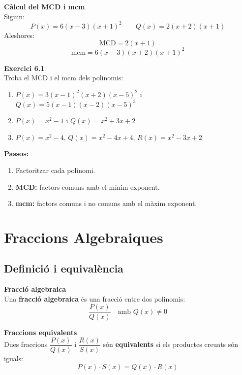 \documentclass[12pt]{article}
\begin{document}
\begin{exemple}
\textbf{Càlcul del MCD i mcm}\\
Siguin:
\[
P(x) = 6(x-3)(x+1)^2 \qquad Q(x) = 2(x+2)(x+1)
\]
Aleshores:
\[
\text{MCD} = 2(x+1)
\]
\[
\text{mcm} = 6(x-3)(x+2)(x+1)^2
\]
\end{exemple}

\begin{exercici}
\textbf{Exercici 6.1}\\
Troba el MCD i el mcm dels polinomis:
\begin{enumerate}[label=\alph*)]
    \item $P(x) = 3(x-1)^2(x+2)(x-5)^2$ i $Q(x) = 5(x-1)(x-2)(x-5)^3$
    \item $P(x) = x^2-1$ i $Q(x) = x^2+3x+2$
    \item $P(x) = x^2-4$, $Q(x) = x^2-4x+4$, $R(x) = x^2-3x+2$
\end{enumerate}
\end{exercici}

\begin{resum}[title=Resum 6: MCD i mcm de Polinomis]
\textbf{Passos:}
\begin{enumerate}
    \item Factoritzar cada polinomi.
    \item \textbf{MCD:} factors comuns amb el mínim exponent.
    \item \textbf{mcm:} factors comuns i no comuns amb el màxim exponent.
\end{enumerate}
\end{resum}

\newpage

\section{Fraccions Algebraiques}

\subsection{Definició i equivalència}

\begin{concept}
\textbf{Fracció algebraica}\\
Una \textbf{fracció algebraica} és una fracció entre dos polinomis:
\[
\dfrac{P(x)}{Q(x)} \quad \text{amb } Q(x) \neq 0
\]

\textbf{Fraccions equivalents}\\
Dues fraccions $\dfrac{P(x)}{Q(x)}$ i $\dfrac{R(x)}{S(x)}$ són \textbf{equivalents} si els productes creuats són iguals:
\[
P(x) \cdot S(x) = Q(x) \cdot R(x)
\]
\end{concept}
\end{document}
